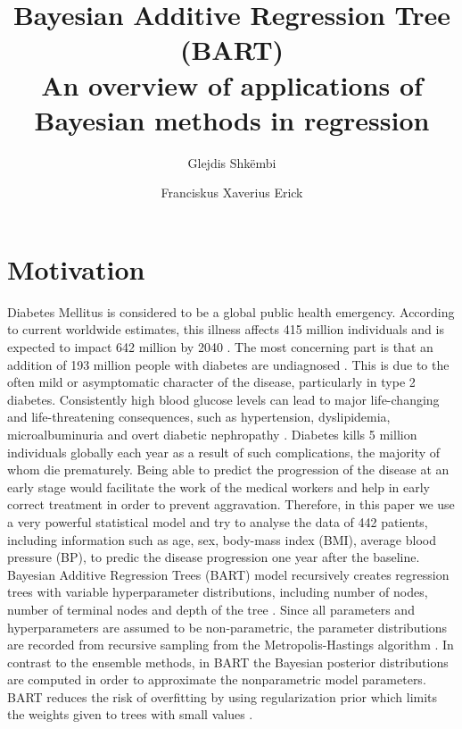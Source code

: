 \documentclass{usiinftr}
\begin{document}
\title{\bf Bayesian Additive Regression Tree (BART) \\ {\normalfont An overview of applications of Bayesian methods in regression }}
\author{Glejdis Shk\"embi}{\dagger}
\author{Franciskus Xaverius Erick}{\dagger}


%
%

\maketitle

\begin{abstract}

\end{abstract}

\section{Motivation}
Diabetes Mellitus is considered to be a global public health emergency. According to current worldwide estimates, this illness affects 415 million individuals and is expected to impact 642 million by 2040 \cite{27}. The most concerning part is that an addition of 193 million people with diabetes are undiagnosed \cite{27}. This is due to the often mild or asymptomatic character of the disease, particularly in type 2 diabetes. Consistently high blood glucose levels can lead to major life-changing and life-threatening consequences, such as hypertension, dyslipidemia, microalbuminuria and overt diabetic nephropathy \cite{27}. Diabetes kills 5 million individuals globally each year as a result of such complications, the majority of whom die prematurely. Being able to predict the progression of the disease at an early stage would facilitate the work of the medical workers and help in early correct treatment in order to prevent aggravation.  Therefore, in this paper we use a very powerful statistical model and try to analyse the data of 442 patients, including information such as age, sex, body-mass index (BMI), average blood pressure (BP), to predic the disease progression one year after the baseline. 
Bayesian Additive Regression Trees (BART) model recursively creates regression trees with variable hyperparameter distributions, including number of nodes, number of terminal nodes and depth of the tree \cite{16}. Since all parameters and hyperparameters are assumed to be non-parametric, the parameter distributions are recorded from recursive sampling from the Metropolis-Hastings algorithm \cite{16}. In contrast to the ensemble methods, in BART the Bayesian posterior distributions are computed in order to approximate the nonparametric model parameters. BART reduces the risk of overfitting by using regularization prior which limits the weights given to trees with small values \cite{16}. 
\end{document}
